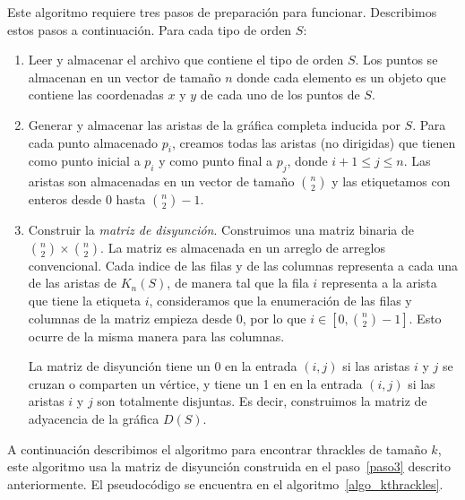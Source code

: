   Este algoritmo requiere tres pasos de preparación para funcionar. Describimos estos pasos a continuación. Para cada tipo de orden $S$:
  \begin{enumerate}
    \item Leer y almacenar el archivo que contiene el tipo de orden $S$.
    Los puntos se almacenan en un vector de tamaño $n$ donde cada elemento es
    un objeto que contiene las coordenadas $x$ y $y$ de cada uno de los puntos
    de $S$.
    \item Generar y almacenar las aristas de la gráfica completa inducida por
    $S$. Para cada punto almacenado $p_i$, creamos todas las aristas (no
    dirigidas) que tienen como punto inicial a $p_i$ y como punto final a $p_j$,
    donde $ i+1 \leq j \leq n$.
    Las aristas son almacenadas en un vector de tamaño $\binom{n}{2}$ y las
    etiquetamos con enteros desde $0$ hasta $\binom{n}{2}-1$.
    \item \label{paso3}Construir la \emph{matriz de disyunción}.
    Construimos una matriz binaria de $\binom{n}{2}\times \binom{n}{2}$. La
    matriz es almacenada en un arreglo de arreglos convencional. Cada
    indice de las filas y de las columnas representa a cada una de las aristas
    de $K_n(S)$, de manera tal que la fila $i$ representa a la arista que tiene
    la etiqueta $i$, consideramos que la enumeración de las filas y columnas de
    la matriz empieza desde $0$, por lo que $i \in [0,\binom{n}{2}-1]$. Esto ocurre de la misma
    manera para las columnas.

    La matriz de disyunción tiene un 0 en la entrada $(i,j)$ si las aristas $i$ y $j$ se cruzan o
    comparten un vértice, y tiene un 1 en en la entrada $(i,j)$ si las aristas $i$ y $j$ son
    totalmente disjuntas. Es decir, construimos la matriz de adyacencia de la gráfica $D(S)$.
  \end{enumerate}

  A continuación describimos el algoritmo para encontrar thrackles
  de tamaño $k$, este algoritmo usa la matriz de disyunción construida en el
  paso~\ref{paso3} descrito anteriormente. El pseudocódigo se encuentra en el
  algoritmo~\ref{algo_kthrackles}.

